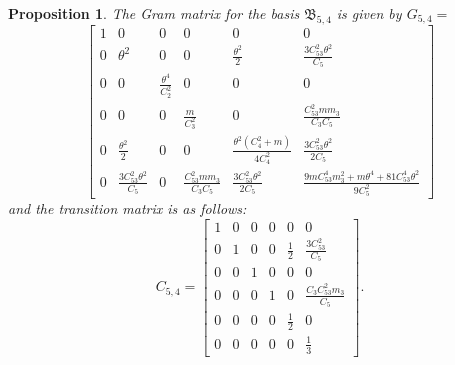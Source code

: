 \documentclass[table]{amsart}
\newtheorem{proposition}[theorem]{Proposition}
\numberwithin{equation}{section}
\begin{document}
\begin{proposition}
    The Gram matrix for the basis $\mathfrak{B}_{5, 4}$ is given by $G_{5,4}=$
    \[
\begin{bmatrix}
1 & 0 & 0 & 0 & 0 & 0 \\[8pt]

0 
& \theta^2 
& 0 
& 0 
& \tfrac{\theta^2}{2 } 
& \tfrac{3 C_{53}^2 \theta^2}{ C_5} \\[8pt]

0 
& 0 
& \tfrac{\theta^4}{C_2^2} 
& 0 
& 0 
& 0 \\[8pt]

0 
& 0 
& 0 
& \tfrac{m}{C_3^2} 
& 0 
& \tfrac{C_{53}^2 m m_3}{C_3 C_5} \\[8pt]

0 
& \tfrac{\theta^2}{2 } 
& 0 
& 0 
& \tfrac{\theta^2(C_4^2+m)}{4 C_4^2} 
& \tfrac{3 C_{53}^2 \theta^2}{2  C_5} \\[8pt]

0 
& \tfrac{3 C_{53}^2 \theta^2}{ C_5} 
& 0 
& \tfrac{C_{53}^2 m m_3}{C_3 C_5} 
& \tfrac{3 C_{53}^2 \theta^2}{2  C_5} 
& \tfrac{9 m  C_{53}^4 m_3^2 + m  \theta^4 + 81 C_{53}^4 \theta^2}{9  C_5^2}
\end{bmatrix}
\]
and the transition matrix is as follows:
\[C_{5,4}=
\begin{bmatrix}
1 & 0 & 0 & 0 & 0 & 0 \\[8pt]
0 & 1 & 0 & 0 & \tfrac{1}{2} & \tfrac{3 C_{53}^2}{C_5} \\[8pt]
0 & 0 & 1 & 0 & 0 & 0 \\[8pt]
0 & 0 & 0 & 1 & 0 & \tfrac{C_3 C_{53}^2 m_3}{C_5} \\[8pt]
0 & 0 & 0 & 0 & \tfrac{1}{2} & 0 \\[8pt]
0 & 0 & 0 & 0 & 0 & \tfrac{1}{3}
\end{bmatrix}.
\]
\end{proposition}
\end{document}
